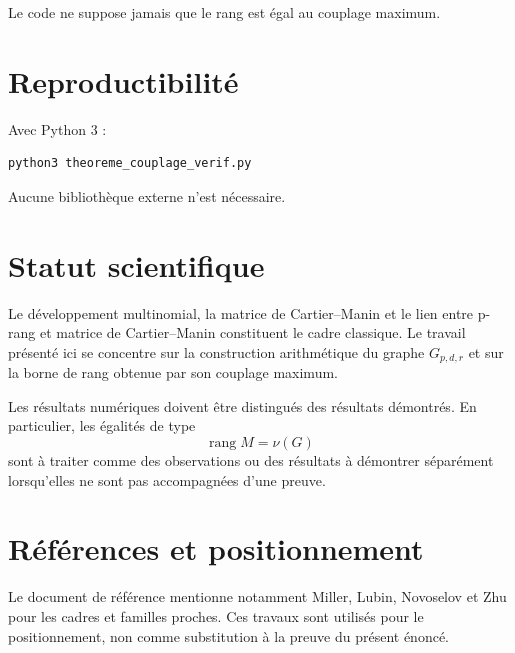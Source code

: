 \documentclass[11pt,a4paper]{article}
\begin{document}
Le code ne suppose jamais que le rang est égal au couplage maximum.

\section{Reproductibilité}

Avec Python 3 :
\begin{verbatim}
python3 theoreme_couplage_verif.py
\end{verbatim}

Aucune bibliothèque externe n'est nécessaire.

\section{Statut scientifique}

Le développement multinomial, la matrice de Cartier--Manin et le lien
entre p-rang et matrice de Cartier--Manin constituent le cadre classique.
Le travail présenté ici se concentre sur la construction arithmétique du
graphe $G_{p,d,r}$ et sur la borne de rang obtenue par son couplage
maximum.

Les résultats numériques doivent être distingués des résultats démontrés.
En particulier, les égalités de type
\[
\operatorname{rang}M=\nu(G)
\]
sont à traiter comme des observations ou des résultats à démontrer
séparément lorsqu'elles ne sont pas accompagnées d'une preuve.

\section{Références et positionnement}

Le document de référence mentionne notamment Miller, Lubin, Novoselov
et Zhu pour les cadres et familles proches. Ces travaux sont utilisés
pour le positionnement, non comme substitution à la preuve du présent
énoncé.
\end{document}
